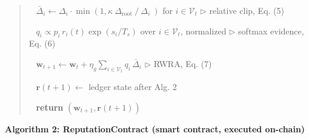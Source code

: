\documentclass[cmc,article,submit,moreauthors,pdftex]{Definitions/tsp}
\begin{document}
\begin{quote}
\noindent{}~ $\bar{\Delta}_i \leftarrow \Delta_i \cdot \min(1, \kappa\ \Delta_{\mathrm{root}}\ / \ \Delta_i\ )$ for $i \in \mathcal{V}_t$  $\triangleright$ relative clip, Eq. (5)

\noindent{}~ $q_i \propto p_i \, r_i(t) \exp(s_i / T_s)$ over $i \in \mathcal{V}_t$, normalized  $\triangleright$ softmax evidence, Eq. (6)

\noindent{}~ $\mathbf{w}_{t+1} \leftarrow \mathbf{w}_t + \eta_g \sum_{i \in \mathcal{V}_t} q_i \, \bar{\Delta}_i$  $\triangleright$ RWRA, Eq. (7)

\noindent{}~ $\mathbf{r}(t+1) \leftarrow$ ledger state after Alg. 2

\noindent{}~ \textbf{return} $(\mathbf{w}_{t+1}, \mathbf{r}(t+1))$
\end{quote}

\vspace{0.5em}

\noindent\textbf{Algorithm 2: ReputationContract (smart contract, executed on-chain)}
\end{document}

